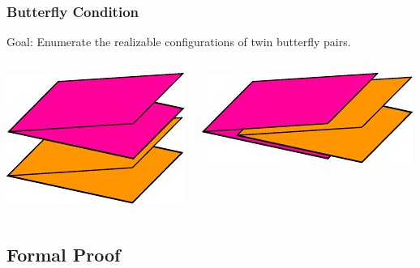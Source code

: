 \documentclass{beamer}
\begin{document}
\begin{frame}
\frametitle{Butterfly Condition}

\begin{block}{Goal:}
Enumerate the realizable configurations of twin butterfly pairs.
\end{block}

\bigskip

\begin{columns}[c]
\includegraphics[width=\textwidth]{sam_images/butterfly-stack.pdf}

\pause

\includegraphics[width=\textwidth]{sam_images/butterfly-nest.pdf}

\end{columns}

\end{frame}




\subsection{Formal Proof}
\end{document}
